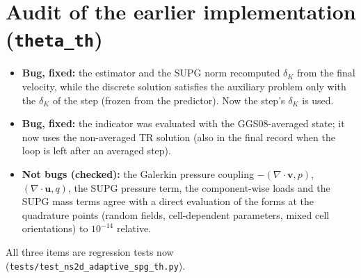 \documentclass[11pt,a4paper]{article}
\newcommand{\bu}{\boldsymbol{u}}
\newcommand{\bv}{\boldsymbol{v}}
\newcommand{\code}[1]{\texttt{#1}}
\begin{document}
\section{Audit of the earlier implementation (\code{theta\_th})}
\begin{itemize}
\item \textbf{Bug, fixed:} the estimator and the SUPG norm recomputed $\delta_K$ from the final velocity, while the discrete
solution satisfies the auxiliary problem only with the $\delta_K$ of the step (frozen from the predictor). Now the step's
$\delta_K$ is used.
\item \textbf{Bug, fixed:} the indicator was evaluated with the GGS08-averaged state; it now uses the non-averaged TR solution
(also in the final record when the loop is left after an averaged step).
\item \textbf{Not bugs (checked):} the Galerkin pressure coupling $-(\nabla\cdot\bv,p)$, $(\nabla\cdot\bu,q)$, the SUPG pressure
term, the component-wise loads and the SUPG mass terms agree with a direct evaluation of the forms at the quadrature points
(random fields, cell-dependent parameters, mixed cell orientations) to $10^{-14}$ relative.
\end{itemize}
All three items are regression tests now (\code{tests/test\_ns2d\_adaptive\_spg\_th.py}).
\end{document}

